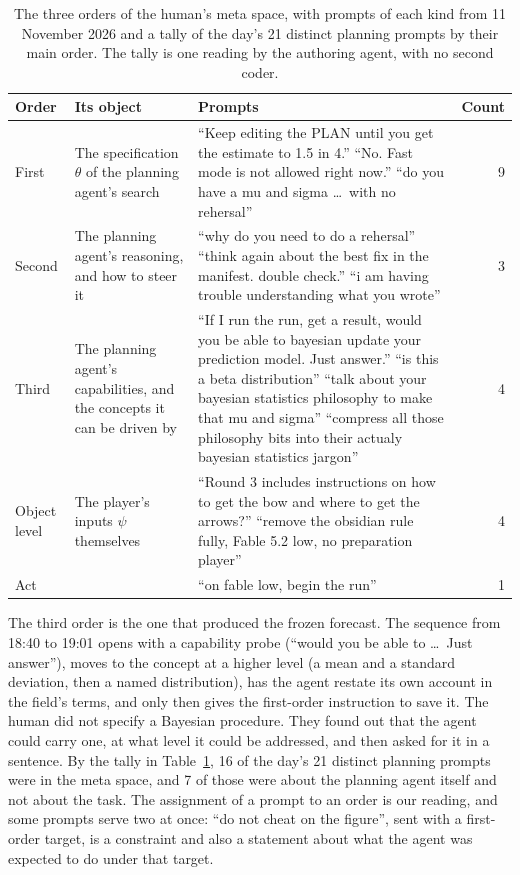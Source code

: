 \documentclass[11pt,a4paper]{article}
\begin{document}
\begin{table}[!tbp]
\caption{The three orders of the human's meta space, with prompts of each kind from 11 November 2026 and a tally of the day's 21 distinct planning prompts by their main order. The tally is one reading by the authoring agent, with no second coder.}
\label{tab:orders}
\small
\begin{tabularx}{\textwidth}{@{}l>{\raggedright\arraybackslash}p{}>{\raggedright\arraybackslash}Xr@{}}
\toprule
Order & Its object & Prompts & Count \\
\midrule
First & The specification $\theta$ of the planning agent's search & ``Keep editing the PLAN until you get the estimate to 1.5 in 4.'' ``No. Fast mode is not allowed right now.'' ``do you have a mu and sigma \ldots\ with no rehersal'' & 9 \\
Second & The planning agent's reasoning, and how to steer it & ``why do you need to do a rehersal'' ``think again about the best fix in the manifest. double check.'' ``i am having trouble understanding what you wrote'' & 3 \\
Third & The planning agent's capabilities, and the concepts it can be driven by & ``If I run the run, get a result, would you be able to bayesian update your prediction model. Just answer.'' ``is this a beta distribution'' ``talk about your bayesian statistics philosophy to make that mu and sigma'' ``compress all those philosophy bits into their actualy bayesian statistics jargon'' & 4 \\
\addlinespace
Object level & The player's inputs $\psi$ themselves & ``Round 3 includes instructions on how to get the bow and where to get the arrows?'' ``remove the obsidian rule fully, Fable 5.2 low, no preparation player'' & 4 \\
Act & & ``on fable low, begin the run'' & 1 \\
\bottomrule
\end{tabularx}
\end{table}

The third order is the one that produced the frozen forecast. The sequence from 18:40 to 19:01 opens with a capability probe (``would you be able to \ldots\ Just answer''), moves to the concept at a higher level (a mean and a standard deviation, then a named distribution), has the agent restate its own account in the field's terms, and only then gives the first-order instruction to save it. The human did not specify a Bayesian procedure. They found out that the agent could carry one, at what level it could be addressed, and then asked for it in a sentence. By the tally in Table~\ref{tab:orders}, 16 of the day's 21 distinct planning prompts were in the meta space, and 7 of those were about the planning agent itself and not about the task. The assignment of a prompt to an order is our reading, and some prompts serve two at once: ``do not cheat on the figure'', sent with a first-order target, is a constraint and also a statement about what the agent was expected to do under that target.
\end{document}
